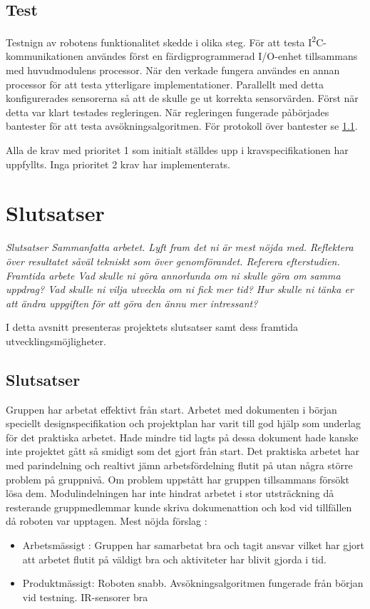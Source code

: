 \documentclass[11pt]{article}
\begin{document}
\begin{flushleft}
\subsection{Test}
Testnign av robotens funktionalitet skedde i olika steg. För att testa I\textsuperscript{2}C-kommunikationen användes först en färdigprogrammerad I/O-enhet tillsammans med huvudmodulens processor. När den verkade fungera användes en annan processor för att testa ytterligare implementationer.  Parallellt med detta konfigurerades sensorerna så att de skulle ge ut korrekta sensorvärden. Först när detta var klart testades regleringen. När regleringen fungerade påbörjades bantester för att testa avsökningsalgoritmen. För protokoll över bantester se \ref{}. 

Alla de krav med prioritet 1 som initialt ställdes upp i kravspecifikationen har uppfyllts. Inga prioritet 2 krav har implementerats.

\pagebreak

\section{Slutsatser}
\textit{Slutsatser
Sammanfatta arbetet. 
Lyft fram det ni är mest nöjda med.
Reflektera över resultatet såväl tekniskt som över genomförandet. Referera efterstudien.}
\textit{Framtida arbete
Vad skulle ni göra annorlunda om ni skulle göra om samma uppdrag?
Vad skulle ni vilja utveckla om ni fick mer tid?
Hur skulle ni tänka er att ändra uppgiften för att göra den ännu mer intressant?}

I detta avsnitt presenteras projektets slutsatser samt dess framtida utvecklingsmöjligheter.

\subsection{Slutsatser}

Gruppen har arbetat effektivt från start. Arbetet med dokumenten i början speciellt designspecifikation och projektplan har varit till god hjälp som underlag för det praktiska arbetet. Hade mindre tid lagts på dessa dokument hade kanske inte projektet gått så smidigt som det gjort från start. Det praktiska arbetet har med parindelning och realtivt jämn arbetsfördelning flutit på utan några större problem på gruppnivå. Om problem uppstått har gruppen tillsammans försökt lösa dem. Modulindelningen har inte hindrat arbetet i stor utsträckning då resterande gruppmedlemmar kunde skriva dokumenattion och kod vid tillfällen då roboten var upptagen.
Mest nöjda förslag : 
\begin{itemize}
\item Arbetsmässigt : Gruppen har samarbetat bra och tagit ansvar vilket har gjort att arbetet flutit på väldigt bra och aktiviteter har blivit gjorda i tid. 
\item Produktmässigt: Roboten snabb. Avsökningsalgoritmen fungerade från början vid testning. IR-sensorer bra
\end{itemize}


\end{flushleft}
\end{document}

